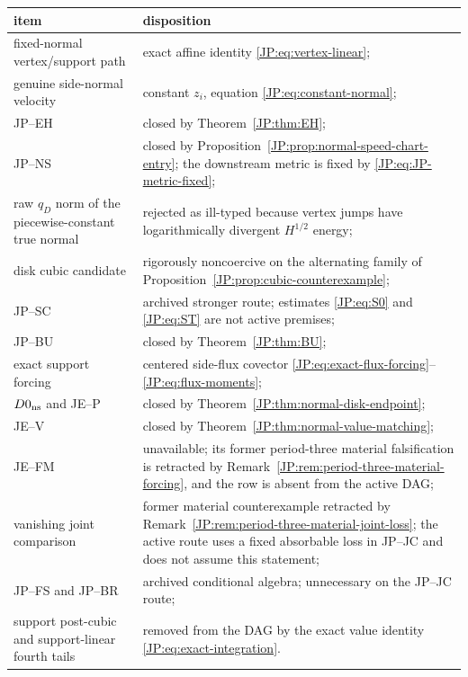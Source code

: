 \documentclass[11pt]{amsart}
\numberwithin{equation}{section}
\theoremstyle{definition}
\theoremstyle{remark}
\begin{document}
\begin{center}
\begin{longtable}{>{\raggedright\arraybackslash}p{.34\linewidth}
                  >{\raggedright\arraybackslash}p{.54\linewidth}}
\toprule
item & disposition\\
\midrule
fixed-normal vertex/support path & exact affine identity
\eqref{JP:eq:vertex-linear};\\
genuine side-normal velocity & constant $z_i$, equation
\eqref{JP:eq:constant-normal};\\
JP--EH & closed by Theorem~\ref{JP:thm:EH};\\
JP--NS & closed by Proposition~\ref{JP:prop:normal-speed-chart-entry}; the
downstream metric is fixed by \eqref{JP:eq:JP-metric-fixed};\\
raw $q_D$ norm of the piecewise-constant true normal & rejected as
ill-typed because vertex jumps have logarithmically divergent
$H^{1/2}$ energy;\\
disk cubic candidate & rigorously noncoercive on the alternating family of
Proposition~\ref{JP:prop:cubic-counterexample};\\
JP--SC & archived stronger route; estimates \eqref{JP:eq:S0} and
\eqref{JP:eq:ST} are not active premises;\\
JP--BU & closed by Theorem~\ref{JP:thm:BU};\\
exact support forcing & centered side-flux covector
\eqref{JP:eq:exact-flux-forcing}--\eqref{JP:eq:flux-moments};\\
$D0_{\rm ns}$ and JE--P & closed by
Theorem~\ref{JP:thm:normal-disk-endpoint};\\
JE--V & closed by Theorem~\ref{JP:thm:normal-value-matching};\\
JE--FM & unavailable; its former period-three material falsification is
retracted by Remark~\ref{JP:rem:period-three-material-forcing}, and the row is
absent from the active DAG;\\
vanishing joint comparison & former material counterexample retracted by
Remark~\ref{JP:rem:period-three-material-joint-loss}; the active route uses a
fixed absorbable loss in JP--JC and does not assume this statement;\\
JP--FS and JP--BR & archived conditional algebra; unnecessary on the
JP--JC route;\\
support post-cubic and support-linear fourth tails & removed from the DAG
by the exact value identity \eqref{JP:eq:exact-integration}.\\
\bottomrule
\end{longtable}
\end{center}
\endgroup
\end{document}
